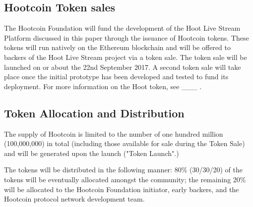 \documentclass{article}
\begin{document}
\subsection{Hootcoin Token sales} %
\label{sub:hoot_token_sales}
The Hootcoin Foundation will fund the development of the Hoot Live Stream Platform discussed in this paper through the issuance of Hootcoin tokens. These tokens will run natively on the Ethereum blockchain and will be offered to backers of the Hoot Live Stream project via a token sale. The token sale will be launched on or about the 22nd September 2017. A second token sale will take place once the initial prototype has been developed and tested to fund its deployment. For more information on the Hoot token, see \_\_\_ .

\subsection{Token Allocation and Distribution} %
\label{sub:token_allocation_and_distribution}
 The supply of Hootcoin is limited to the number of one hundred million (100,000,000) in total (including those available for sale during the Token Sale) and will be generated upon the launch ("Token Launch".)

 The tokens will be distributed in the following manner:
80\% (30/30/20) of the tokens will be eventually allocated amongst the community; the remaining 20\% will be allocated to the Hootcoin Foundation initiator, early backers, and the Hootcoin protocol network development team.
\end{document}
